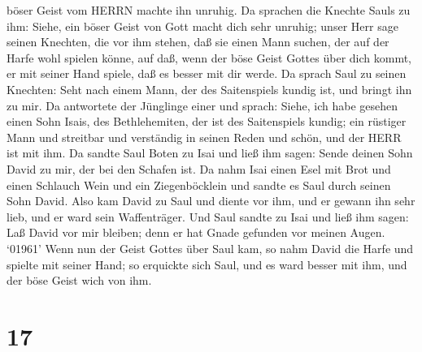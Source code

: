 böser Geist vom HERRN machte ihn unruhig.  Da sprachen die
Knechte Sauls zu ihm: Siehe, ein böser Geist von Gott macht dich sehr
unruhig;  unser Herr sage seinen Knechten, die vor ihm
stehen, daß sie einen Mann suchen, der auf der Harfe wohl spielen könne,
auf daß, wenn der böse Geist Gottes über dich kommt, er mit seiner Hand
spiele, daß es besser mit dir werde.  Da sprach Saul zu
seinen Knechten: Seht nach einem Mann, der des Saitenspiels kundig ist,
und bringt ihn zu mir.  Da antwortete der Jünglinge einer
und sprach: Siehe, ich habe gesehen einen Sohn Isais, des Bethlehemiten,
der ist des Saitenspiels kundig; ein rüstiger Mann und streitbar und
verständig in seinen Reden und schön, und der HERR ist mit ihm.
 Da sandte Saul Boten zu Isai und ließ ihm sagen: Sende
deinen Sohn David zu mir, der bei den Schafen ist.  Da nahm
Isai einen Esel mit Brot und einen Schlauch Wein und ein Ziegenböcklein
und sandte es Saul durch seinen Sohn David.  Also kam David
zu Saul und diente vor ihm, und er gewann ihn sehr lieb, und er ward
sein Waffenträger.  Und Saul sandte zu Isai und ließ ihm
sagen: Laß David vor mir bleiben; denn er hat Gnade gefunden vor meinen
Augen.  `01961' Wenn nun der Geist Gottes über Saul kam, so
nahm David die Harfe und spielte mit seiner Hand; so erquickte sich
Saul, und es ward besser mit ihm, und der böse Geist wich von ihm.

\hypertarget{section-16}{%
\section{17}\label{section-16}}

